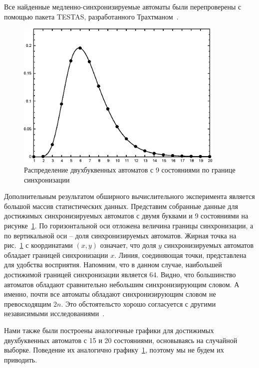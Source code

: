 \documentclass[11pt]{article}
\begin{document}
Все найденные медленно-синхронизируемые автоматы были перепроверены с помощью
пакета TESTAS, разработанного Трахтманом~\cite{Tr06}.



\begin{figure}[h]
\begin{center}
\includegraphics[width=10cm]{stat.eps}
\caption{Распределение двухбуквенных автоматов с 9 состояниями по границе синхронизации}
\label{fig:stat}
\end{center}
\end{figure}

Дополнительным результатом обширного вычислительного эксперимента является большой массив 
статистических данных. Представим собранные данные для достижимых синхронизируемых автоматов 
с двумя буквами и 9 состояниями на рисунке~\ref{fig:stat}. По горизонтальной оси отложена 
величина границы синхронизации, а по вертикальной оси -- доля синхронизируемых автоматов.
Жирная точка на рис.~\ref{fig:stat} с координатами $(x,y)$ означает, что доля $y$ синхронизируемых
автоматов обладает границей синхронизации $x$. Линия, соединяющая точки, представлена для
удобства восприятия. Напомним, что в данном случае, наибольшей достижимой границей
синхронизации является $64$. Видно, что большинство автоматов обладают сравнительно небольшим
синхронизирующим словом. А именно, почти все автоматы обладают синхронизирующим словом
не превосходящим $2n$. Это обстоятельсто хорошо согласуется с другими независимыми 
исследованиями~\cite{Tr11, ST}.

Нами также были построены аналогичные графики для достижимых двухбуквенных автоматов с 15 и 20
состояниями, основываясь на случайной выборке. Поведение их аналогично графику~\ref{fig:stat},
поэтому мы не будем их приводить.
\end{document}
